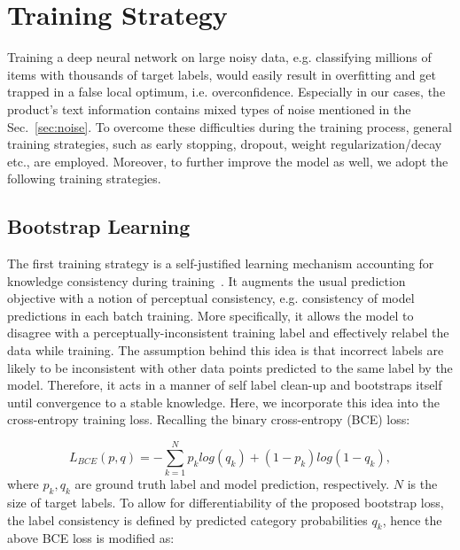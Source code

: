 \documentclass[11pt,dvipsnames]{article}
\begin{document}
\section{Training Strategy}\label{sec:training}
Training a deep neural network on large noisy data, e.g. classifying millions of items with thousands of target labels, would easily result in overfitting and get trapped in a false local optimum, i.e. overconfidence. Especially in our cases, the product's text information contains mixed types of noise mentioned in the Sec.~\ref{sec:noise}. To overcome these difficulties during the training process, general training strategies, such as early stopping, dropout, weight regularization/decay etc., are employed. Moreover, to further improve the model as well, we adopt the following training strategies.   


\subsection{Bootstrap Learning}
The first training strategy is a self-justified learning mechanism accounting for knowledge consistency during training~\cite{reed2014training}. It augments the usual prediction objective with a notion of perceptual consistency, e.g. consistency of model predictions in each batch training. More specifically, it allows the model to disagree with a perceptually-inconsistent training label and effectively relabel the data while training. The assumption behind this idea is that incorrect labels are likely to be inconsistent with other data points predicted to the same label by the model. Therefore, it acts in a manner of self label clean-up and bootstraps itself until convergence to a stable knowledge. Here, we incorporate this idea into the cross-entropy training loss. Recalling the binary cross-entropy (BCE) loss:

\begin{equation}\label{eq:bce}
    L_{BCE}(p,q) = -\sum_{k=1}^{N}p_klog(q_k)+(1-p_k)log(1-q_k),
\end{equation}
where $p_k, q_k$ are ground truth label and model prediction, respectively. $N$ is the size of target labels. To allow for differentiability of the proposed bootstrap loss, the label consistency is defined by predicted category probabilities $q_k$, hence the above BCE loss is modified as:
\end{document}

